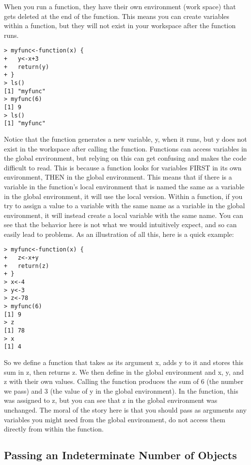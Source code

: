\documentclass[12pt, oneside]{amsart}   	%
\begin{document}
When you run a function, they have their own environment (work space) that gets deleted at the end of the function. This means you can create variables within a function, but they will not exist in your workspace after the function runs.

\begin{verbatim}
> myfunc<-function(x) {
+   y<-x+3
+   return(y)
+ }
> ls()
[1] "myfunc"
> myfunc(6)
[1] 9
> ls()
[1] "myfunc"
\end{verbatim}

Notice that the function generates a new variable, y, when it runs, but y does not exist in the workspace after calling the function. Functions can access variables in the global environment, but relying on this can get confusing and makes the code difficult to read. This is because a function looks for variables FIRST in its own environment, THEN in the global environment. This means that if there is a variable in the function's local environment that is named the same as a variable in the global environment, it will use the local version. Within a function, if you try to assign a value to a variable with the same name as a variable in the global environment, it will instead create a local variable with the same name. You can see that the behavior here is not what we would intuitively expect, and so can easily lead to problems. As an illustration of all this, here is a quick example:

\begin{verbatim}
> myfunc<-function(x) {
+   z<-x+y
+   return(z)
+ }
> x<-4
> y<-3
> z<-78
> myfunc(6)
[1] 9
> z
[1] 78
> x
[1] 4
\end{verbatim}

So we define a function that takes as its argument x, adds y to it and stores this sum in z, then returns z. We then define in the global environment and x, y, and z with their own values. Calling the function produces the sum of 6 (the number we pass) and 3 (the value of y in the global environment). In the function, this was assigned to z, but you can see that z in the global environment was unchanged. The moral of the story here is that you should pass as arguments any variables you might need from the global environment, do not access them directly from within the function. 

\subsection{Passing an Indeterminate Number of Objects}
\end{document}
